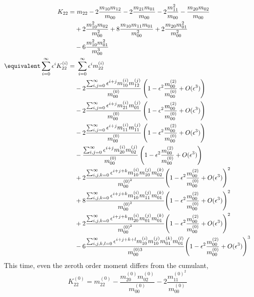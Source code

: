 \begin{align*}
  K_{22} = &\ m_{22}
   - 2 \frac{m_{10}m_{12}}{m_{00}} - 2\frac{m_{21}m_{01}}{m_{00}}
    - 2 \frac{m_{11}^2}{m_{00}} - \frac{m_{20}m_{02}}{m_{00}}
    \\
   &  + 2 \frac{m_{10}^2 m_{02}}{m_{00}^2} + 8 \frac{m_{10}m_{11}m_{01}}{m_{00}^2}
    + 2 \frac{m_{20}m_{01}^2}{m_{00}^2}
    \\
   &  - 6 \frac{m_{10}^2 m_{01}^2}{m_{00}^3}
  \\\equivalent
  \sum_{i=0}^\infty \epsilon^i K_{22}^{(i)}
  = &\ \sum_{i=0}^\infty \epsilon^i m_{22}^{(i)}
  \\&
  - 2 \frac{ \sum_{i,j=0}^\infty \epsilon^{i+j} m_{10}^{(i)} m_{12}^{(j)} }{m_{00}^{(0)}}
   \left(1 - \epsilon^2 \frac{m_{00}^{(2)}}{m_{00}^{(0)}}  + O(\epsilon^3)\right)
  \\&
  - 2 \frac{ \sum_{i,j=0}^\infty \epsilon^{i+j} m_{21}^{(i)} m_{01}^{(j)} }{m_{00}^{(0)}}
   \left(1 - \epsilon^2 \frac{m_{00}^{(2)}}{m_{00}^{(0)}}  + O(\epsilon^3)\right)
  \\&
  - 2 \frac{ \sum_{i,j=0}^\infty \epsilon^{i+j} m_{11}^{(i)} m_{11}^{(j)} }{m_{00}^{(0)}}
   \left(1 - \epsilon^2 \frac{m_{00}^{(2)}}{m_{00}^{(0)}}  + O(\epsilon^3)\right)
  \\&
  -   \frac{ \sum_{i,j=0}^\infty \epsilon^{i+j} m_{20}^{(i)} m_{02}^{(j)} }{m_{00}^{(0)}}
   \left(1 - \epsilon^2 \frac{m_{00}^{(2)}}{m_{00}^{(0)}}  + O(\epsilon^3)\right)
  \\&
  + 2 \frac{ \sum_{i,j,k=0}^\infty \epsilon^{i+j+k} m_{10}^{(i)}m_{10}^{(j)}m_{02}^{(k)} }
  {m_{00}^{{(0)}^2}}
   {\left(1 - \epsilon^2 \frac{m_{00}^{(2)}}{m_{00}^{(0)}}  + O(\epsilon^3)\right)}^2
  \\&
  + 8 \frac{ \sum_{i,j,k=0}^\infty \epsilon^{i+j+k} m_{10}^{(i)}m_{11}^{(j)}m_{01}^{(k)} }
  {m_{00}^{{(0)}^2}}
   {\left(1 - \epsilon^2 \frac{m_{00}^{(2)}}{m_{00}^{(0)}}  + O(\epsilon^3)\right)}^2
  \\&
  + 2 \frac{ \sum_{i,j,k=0}^\infty \epsilon^{i+j+k} m_{20}^{(i)}m_{01}^{(j)}m_{01}^{(k)} }
  {m_{00}^{{(0)}^2}}
   {\left(1 - \epsilon^2 \frac{m_{00}^{(2)}}{m_{00}^{(0)}}  + O(\epsilon^3)\right)}^2
  \\&
  - 6 \frac{ \sum_{i,j,k,l=0}^\infty \epsilon^{i+j+k+l} m_{10}^{(i)}m_{10}^{(j)}m_{01}^{(k)}m_{01}^{(l)}}{m_{00}^{(0)3}}
   {\left(1 - \epsilon^2 \frac{m_{00}^{(2)}}{m_{00}^{(0)}}  + O(\epsilon^3)\right)}^3
\end{align*}
This time, even the zeroth order moment differs from the cumulant,
\begin{equation*}
  K_{22}^{(0)}
  = m_{22}^{(0)} - \frac{ m_{20}^{(0)} m_{02}^{(0)} }{m_{00}^{(0)}} - 2\frac{ m_{11}^{{(0)}^2}  }{m_{00}^{(0)}}
\end{equation*}
